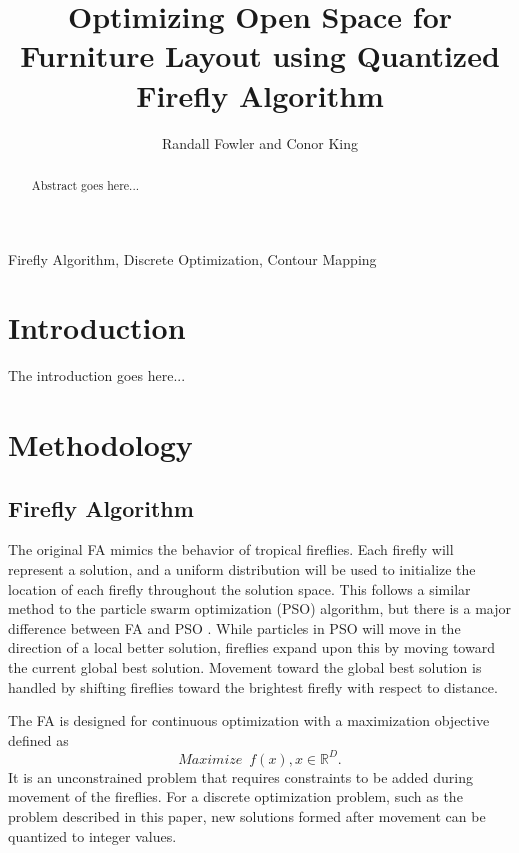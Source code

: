 \documentclass[conference]{IEEEtran}
\begin{document}
\graphicspath{{figures/}} %

\title{Optimizing Open Space for Furniture Layout using Quantized Firefly Algorithm}

\author{
    Randall Fowler and Conor King
}

\maketitle

\begin{abstract}
Abstract goes here...
\end{abstract}

\begin{IEEEkeywords}
Firefly Algorithm, Discrete Optimization, Contour Mapping
\end{IEEEkeywords}

\section{Introduction}
The introduction goes here...

\section{Methodology}
    \subsection{Firefly Algorithm}
    The original FA mimics the behavior of tropical fireflies. Each firefly will represent a solution, and a uniform distribution will be used to initialize the location of each firefly throughout the solution space. This follows a similar method to the particle swarm optimization (PSO) algorithm, but there is a major difference between FA and PSO \cite{swarmIntAlg}. While particles in PSO will move in the direction of a local better solution, fireflies expand upon this by moving toward the current global best solution. Movement toward the global best solution is handled by shifting fireflies toward the brightest firefly with respect to distance.

    The FA is designed for continuous optimization with a maximization objective defined as 
    \begin{equation}
    \label{OptObj}
        Maximize\;\: f(x), x \in \mathbb{R}^D.
    \end{equation}
    It is an unconstrained problem that requires constraints to be added during movement of the fireflies. For a discrete optimization problem, such as the problem described in this paper, new solutions formed after movement can be quantized to integer values.
\end{document}
